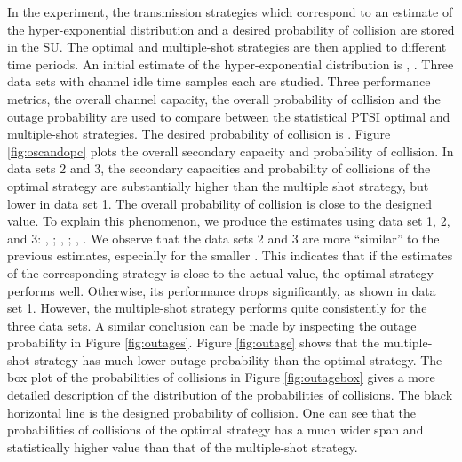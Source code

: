 \documentclass[10pt,final,journal,letterpaper]{IEEEtran}
\begin{document}
\par
In the experiment, the transmission strategies which correspond to an estimate of the hyper-exponential distribution and a desired probability of collision are stored in the SU. The optimal and multiple-shot strategies are then applied to different time periods. An initial estimate of the hyper-exponential distribution is , . Three data sets with  channel idle time samples each are studied. Three performance metrics, the overall channel capacity, the overall probability of collision and the outage probability are used to compare between the statistical PTSI optimal and multiple-shot strategies. The desired probability of collision is . Figure \ref{fig:oscandopc} plots the overall secondary capacity and probability of collision. In data sets 2 and 3, the secondary capacities and probability of collisions of the optimal strategy are substantially higher than the multiple shot strategy, but lower in data set 1. The overall probability of collision is close to the designed value. To explain this phenomenon, we produce the estimates using data set 1, 2, and 3: , ; , ; , . We observe that the data sets 2 and 3 are more ``similar'' to the previous estimates, especially for the smaller . This indicates that if the estimates of the corresponding strategy is close to the actual value, the optimal strategy performs well. Otherwise, its performance drops significantly, as shown in data set 1. However, the multiple-shot strategy performs quite consistently for the three data sets. A similar conclusion can be made by inspecting the outage probability in Figure \ref{fig:outages}. Figure \ref{fig:outage} shows that the multiple-shot strategy has much lower outage probability than the optimal strategy. The box plot of the probabilities of collisions in Figure \ref{fig:outagebox} gives a more detailed description of the distribution of the probabilities of collisions. The black horizontal line is the designed probability of collision. One can see that the probabilities of collisions of the optimal strategy has a much wider span and statistically higher value than that of the multiple-shot strategy.
\begin{figure*}[!t]
  \centering
  \caption{Overall secondary capacity and probability of collision in three data sets.}
  \label{fig:oscandopc}
\end{figure*}
\begin{figure*}[!t]
  \centering
  \caption{Outage probability evaluated every 100 channel idle times.}
  \label{fig:outages}
\end{figure*}
\end{document}
